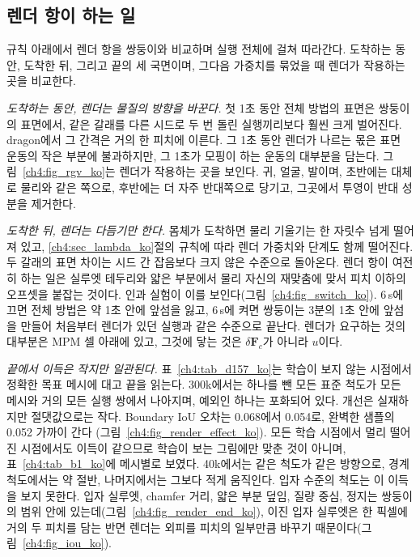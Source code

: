 \subsection{렌더 항이 하는 일}
\label{ch4:sec_render_effect_ko}
규칙 아래에서 렌더 항을 쌍둥이와 비교하며 실행 전체에 걸쳐 따라간다. 도착하는 동안, 도착한 뒤, 그리고 끝의 세 국면이며, 그다음
가중치를 묶었을 때 렌더가 작용하는 곳을 비교한다.

\textit{도착하는 동안, 렌더는 물질의 방향을 바꾼다.} 첫 1초 동안 전체 방법의 표면은 쌍둥이의 표면에서, 같은 갈래를 다른
시드로 두 번 돌린 실행끼리보다 훨씬 크게 벌어진다. dragon에서 그 간격은 거의 한 피치에 이른다. 그 1초 동안 렌더가 나르는
몫은 표면 운동의 작은 부분에 불과하지만, 그 1초가 모핑이 하는 운동의 대부분을 담는다. 그림~\ref{ch4:fig_rgv_ko}는 렌더가
작용하는 곳을 보인다. 귀, 얼굴, 발이며, 초반에는 대체로 물리와 같은 쪽으로, 후반에는 더 자주 반대쪽으로 당기고, 그곳에서
투영이 반대 성분을 제거한다.

\textit{도착한 뒤, 렌더는 다듬기만 한다.} 몸체가 도착하면 물리 기울기는 한 자릿수 넘게 떨어져 있고, \ref{ch4:sec_lambda_ko}절의
규칙에 따라 렌더 가중치와 단계도 함께 떨어진다. 두 갈래의 표면 차이는 시드 간 잡음보다 크지 않은 수준으로 돌아온다. 렌더
항이 여전히 하는 일은 실루엣 테두리와 얇은 부분에서 물리 자신의 재맞춤에 맞서 피치 이하의 오프셋을 붙잡는 것이다. 인과
실험이 이를 보인다(그림~\ref{ch4:fig_switch_ko}). 6\,s에 끄면 전체 방법은 약 1초 안에 앞섬을 잃고, 6\,s에 켜면 쌍둥이는 3분의
1초 안에 앞섬을 만들어 처음부터 렌더가 있던 실행과 같은 수준으로 끝난다. 렌더가 요구하는 것의 대부분은 MPM 셀 아래에 있고,
그것에 닿는 것은 $\delta\mathbf{F}_c$가 아니라 $u$이다.

\textit{끝에서 이득은 작지만 일관된다.} 표~\ref{ch4:tab_d157_ko}는 학습이 보지 않는 시점에서 정확한 목표 메시에 대고 끝을
읽는다. 300k에서는 하나를 뺀 모든 표준 척도가 모든 메시와 거의 모든 실행 쌍에서 나아지며, 예외인 하나는 포화되어 있다. 개선은
실재하지만 절댓값으로는 작다. Boundary IoU 오차는 0.068에서 0.054로, 완벽한 샘플의 0.052 가까이 간다
(그림~\ref{ch4:fig_render_effect_ko}). 모든 학습 시점에서 멀리 떨어진 시점에서도 이득이 같으므로 학습이 보는 그림에만 맞춘
것이 아니며, 표~\ref{ch4:tab_b1_ko}에 메시별로 보였다. 40k에서는 같은 척도가 같은 방향으로, 경계 척도에서는 약 절반,
나머지에서는 그보다 적게 움직인다. 입자 수준의 척도는 이 이득을 보지 못한다. 입자 실루엣, chamfer 거리, 얇은 부분 덮임, 질량
중심, 정지는 쌍둥이의 범위 안에 있는데(그림~\ref{ch4:fig_render_end_ko}), 이진 입자 실루엣은 한 픽셀에 거의 두 피치를 담는
반면 렌더는 외피를 피치의 일부만큼 바꾸기 때문이다(그림~\ref{ch4:fig_iou_ko}).


